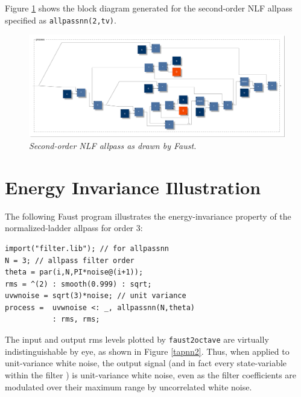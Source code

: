 \documentclass[twoside,a4paper]{article}
\begin{document}
Figure \ref{nlf2} shows the block diagram generated for the
second-order NLF allpass specified as \texttt{allpassnn(2,tv)}.

\begin{figure}[ht]
\center
\includegraphics[width=6.5in]{fig/nlf2.pdf}
\caption{\label{nlf2}{\it Second-order NLF allpass as drawn by Faust.}}
\end{figure} 

\section{Energy Invariance Illustration}

The following Faust program illustrates the energy-invariance property
of the normalized-ladder allpass for order 3:
\begin{verbatim}
import("filter.lib"); // for allpassnn
N = 3; // allpass filter order
theta = par(i,N,PI*noise@(i+1));
rms = ^(2) : smooth(0.999) : sqrt;
uvwnoise = sqrt(3)*noise; // unit variance
process =  uvwnoise <: _, allpassnn(N,theta) 
           : rms, rms;
\end{verbatim}
The input and output rms levels plotted by \texttt{faust2octave} are
virtually indistinguishable by eye, as shown in Figure \ref{tapnn2}.
Thus, when applied to unit-variance white noise, the output signal
(and in fact every state-variable within the filter
\cite{GrayAndMarkel75}) is unit-variance white noise, even as the
filter coefficients are modulated over their maximum range by
uncorrelated white noise.
\end{document}
